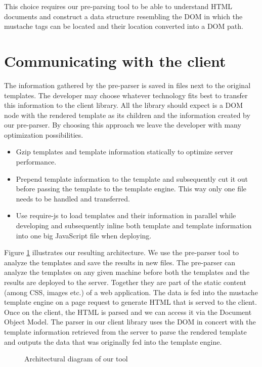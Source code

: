 \documentclass[thesis.tex]{subfiles}
\begin{document}
This choice requires our pre-parsing tool to be able to understand
HTML documents and construct a data structure resembling the DOM in which the
mustache tags can be located and their location converted into a DOM path.

\section{Communicating with the client}

The information gathered by the pre-parser is saved in files next to the
original templates. The developer may choose whatever technology fits best to
transfer this information to the client library. All the library should expect
is a DOM node with the rendered template as its children and the information
created by our pre-parser.
By choosing this approach we leave the developer with many optimization
possibilities.
\begin{itemize}
\item Gzip templates and template information statically to optimize
      server performance.
\item Prepend template information to the template and subsequently
      cut it out before passing the template to the template engine.
      This way only one file needs to be handled and transferred.
\item Use require-js to load templates and their information in parallel
      while developing and subsequently inline both template and
      template information into one big JavaScript file when deploying.
\end{itemize}

Figure \ref{fig:architecture} illustrates our resulting architecture.
We use the pre-parser tool to analyze the templates and save the results in new
files. The pre-parser can analyze the templates on any given machine before
both the templates and the results are deployed to the server. Together they
are part of the static content (among CSS, images etc.) of a web application.
The data is fed into the mustache template engine on a page request to generate
HTML that is served to the client. Once on the client, the HTML is parsed and we
can access it via the Document Object Model. The parser in our client library
uses the DOM in concert with the template information retrieved from the server
to parse the rendered template and outputs the data that was originally fed into
the template engine.
\begin{figure}
	\centering
	\resizebox{\linewidth}{!}{}
	\caption{Architectural diagram of our tool}
	\label{fig:architecture}
\end{figure}
\end{document}
